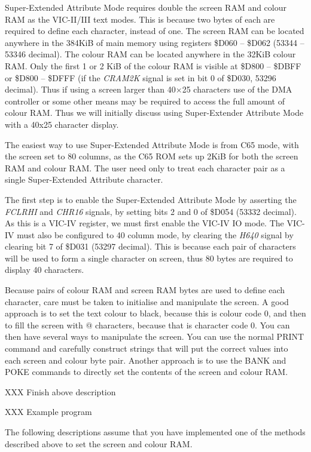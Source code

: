 Super-Extended Attribute Mode requires double the screen RAM and colour RAM as the VIC-II/III text modes. This is because two bytes of each are
required to define each character, instead of one.  The screen RAM can be located anywhere in the 384KiB of main memory using registers \$D060 -- \$D062 (53344 -- 53346 decimal).  The colour RAM can be located anywhere in the 32KiB colour RAM.  Only the first 1 or 2 KiB of the colour RAM is visible at \$D800 -- \$DBFF or \$D800 -- \$DFFF (if the {\em CRAM2K} signal is set in bit 0 of \$D030, 53296 decimal). Thus if using a screen larger than 40$\times$25 characters use of the DMA controller or some other means may be required to access the full amount of colour RAM.  Thus we will initially discuss using Super-Extender Attribute Mode with a 40x25 character display.

The easiest way to use Super-Extended Attribute Mode is from C65 mode, with the screen set to 80 columns, as the C65 ROM sets up 2KiB for both the screen RAM and colour RAM.  The user need only to treat each character pair as a single Super-Extended Attribute character.

The first step is to enable the Super-Extended Attribute Mode by asserting the {\em FCLRHI} and {\em CHR16} signals, by setting bits 2 and 0 of \$D054 (53332 decimal).  As this is a VIC-IV register, we must first enable the VIC-IV IO mode.  The VIC-IV must also be configured to 40 column mode, by clearing the {\em H640} signal by clearing bit 7 of \$D031 (53297 decimal).  This is because each pair of characters will be used to form a single character on screen, thus 80 bytes are required to display 40 characters.

Because pairs of colour RAM and screen RAM bytes are used to define each character, care must be taken to initialise and manipulate the screen.
A good approach is to set the text colour to black, because this is colour code 0, and then to fill the screen with @ characters, because that is
character code 0.  You can then have several ways to manipulate the screen.  You can use the normal PRINT command and carefully construct
strings that will put the correct values into each screen and colour byte pair. Another approach is to use the BANK and POKE commands to directly set the contents of the screen and colour RAM.


XXX Finish above description

XXX Example program

The following descriptions assume that you have implemented one of the methods described above to set the screen and colour RAM.

